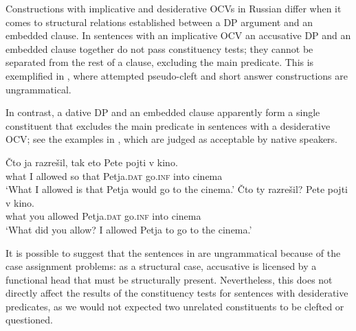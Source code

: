 \documentclass[output=paper,
colorlinks,
citecolor=brown,
newtxmath
]{langscibook}
\begin{document}
\noindent Constructions with implicative and desiderative OCVs in Russian differ when it comes to structural relations established between a DP argument and an embedded clause. In sentences with an implicative OCV an accusative DP and an embedded clause together do not pass constituency tests; they cannot be separated from the rest of a clause, excluding the main predicate. This is exemplified in , where attempted pseudo-cleft and short answer constructions are ungrammatical. 

\begin{exe}
\ex\label{ex5} \begin{xlist}
    \end{xlist}
\end{exe}

\noindent In contrast, a dative DP and an embedded clause apparently form a single constituent that excludes the main predicate in sentences with a desiderative OCV; see the examples in , which are judged as acceptable by native speakers. 

\begin{exe}
\ex\label{ex6} \begin{xlist}
\ex\label{ex6a} 
\gll Čto ja razrešil, tak eto Pete pojti v kino.\\ 
    what I allowed so that Petja.\textsc{dat} go.\textsc{inf} into cinema\\
\glt `What I allowed is that Petja would go to the cinema.'
\ex\label{ex6b} 
\gll Čto ty razrešil? Pete pojti v kino.\\ 
    what you allowed Petja.\textsc{dat} go.\textsc{inf} into cinema\\
\glt `What did you allow? I allowed Petja to go to the cinema.'
    \end{xlist}
\end{exe}

\noindent It is possible to suggest that the sentences in  are ungrammatical because of the case assignment problems: as a structural case, accusative is licensed by a functional head that must be structurally present. Nevertheless, this does not directly affect the results of the constituency tests for sentences with desiderative predicates, as we would not expected two unrelated constituents to be clefted or questioned. \par
\end{document}
